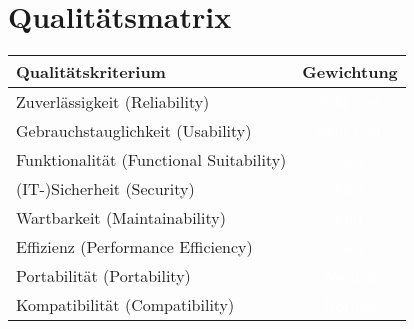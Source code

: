 \section{Qualitätsmatrix}
\begin{center}
    \begin{tabular}{ |l|c| }

        \hline
        \textbf{Qualitätskriterium} & \textbf{Gewichtung}  \\ \hline
        Zuverlässigkeit (Reliability) & \cellcolor[HTML]{120a8f} \textcolor{white}{Sehr Gut}\\ 
        Gebrauchstauglichkeit (Usability) & \cellcolor[HTML]{120a8f} \textcolor{white}{Sehr Gut}\\ 
        Funktionalität (Functional Suitability) & \cellcolor[HTML]{1f11ee} \textcolor{white}{Gut}\\ 
        (IT-)Sicherheit (Security) & \cellcolor[HTML]{1f11ee} \textcolor{white}{Gut}\\ 
        Wartbarkeit (Maintainability) & \cellcolor[HTML]{1f11ee} \textcolor{white}{Gut}\\ 
        Effizienz (Performance Efficiency) & \cellcolor[HTML]{1f11ee} \textcolor{white}{Gut}\\ 
        Portabilität (Portability) & \cellcolor[HTML]{7970f5} \textcolor{white}{Normal}\\ 
        Kompatibilität (Compatibility) & \cellcolor[HTML]{7970f5} \textcolor{white}{Normal}
        \\ \hline
        \end{tabular}
    \end{center}